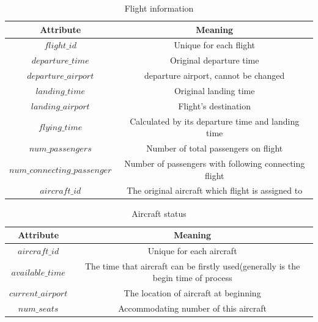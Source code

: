\documentclass[senior]{IPSstyle}
\begin{document}
\begin{table}[t]
\renewcommand{\arraystretch}{1}
\caption{Flight information}
\label{Flight_information_dataset}
\begin{center}
\begin{tabular}{|c|c|}
\hline
\multicolumn{1}{|c|}{Attribute}
&\multicolumn{1}{c|}{Meaning}
\\
\hline
\(flight\_id\)	&	Unique for each flight
\\	\hline
\(departure\_time\)	&	Original departure time
\\	\hline
\(departure\_airport\) &   departure airport, cannot be changed
\\  \hline
\(landing\_time\) &   Original landing time
\\  \hline
\(landing\_airport\) &   Flight's destination
\\  \hline
\(flying\_time\) &   Calculated by its departure time and landing time
\\  \hline
\(num\_passengers\)	&   Number of total passengers on flight
\\  \hline
\(num\_connecting\_passenger\) &   Number of passengers with following connecting flight
\\  \hline
\(aircraft\_id\) &   The original aircraft which flight is  assigned to
\\  \hline
\end{tabular}
\end{center}
\end{table}

\begin{table}
\renewcommand{\arraystretch}{1.2}
\caption{Aircraft status}
\label{Aircraft_status_dataset}
\begin{center}
\begin{tabular}{|c|c|}
\hline
\multicolumn{1}{|c|}{Attribute}
&\multicolumn{1}{c|}{Meaning}
\\  \hline
\(aircraft\_id\)	&	Unique for each aircraft
\\	\hline
\(available\_time\)	&	The time that aircraft can be firstly used(generally is the begin time of process
\\	\hline
\(current\_airport\) &  The location of aircraft at beginning
\\  \hline
\(num\_seats\) &  Accommodating number of this aircraft
\\  \hline
\end{tabular}
\end{center}
\end{table}
\end{document}
